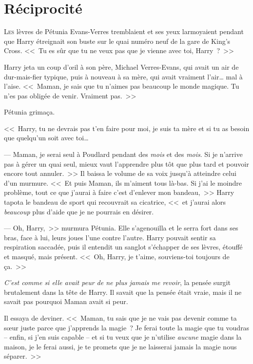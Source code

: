 \chapter{Réciprocité}

\lettrine{L}{es} lèvres de Pétunia Evans-Verres tremblaient et ses yeux larmoyaient pendant que Harry étreignait son buste sur le quai numéro neuf de la gare de King's Cross. <<~Tu es sûr que tu ne veux pas que je vienne avec toi, Harry~?~>>

Harry jeta un coup d'œil à son père, Michael Verres-Evans, qui avait un air de dur-mais-fier typique, puis à nouveau à sa mère, qui avait vraiment l'air… mal à l'aise. <<~Maman, je sais que tu n'aimes pas beaucoup le monde magique. Tu n'es pas obligée de venir. Vraiment pas.~>>

Pétunia grimaça.

<<~Harry, tu ne devrais pas t'en faire pour moi, je suis ta mère et si tu as besoin que quelqu'un soit avec toi…

--- Maman, je serai seul à Poudlard pendant des \emph{mois} et des \emph{mois}. Si je n'arrive pas à gérer un quai seul, mieux vaut l'apprendre plus tôt que plus tard et pouvoir encore tout annuler.~>> Il baissa le volume de sa voix jusqu'à atteindre celui d'un murmure. <<~Et puis Maman, ils m'aiment tous là-bas. Si j'ai le moindre problème, tout ce que j'aurai à faire c'est d'enlever mon bandeau,~>> Harry tapota le bandeau de sport qui recouvrait sa cicatrice, <<~et j'aurai alors \emph{beaucoup} plus d'aide que je ne pourrais en désirer.

--- Oh, Harry,~>> murmura Pétunia. Elle s'agenouilla et le serra fort dans ses bras, face à lui, leurs joues l'une contre l'autre. Harry pouvait sentir sa respiration saccadée, puis il entendit un sanglot s'échapper de ses lèvres, étouffé et masqué, mais présent. <<~Oh, Harry, je t'aime, souviens-toi toujours de ça.~>>

\emph{C'est comme si elle avait peur de ne plus jamais me revoir}, la pensée surgit brutalement dans la tête de Harry. Il savait que la pensée était vraie, mais il ne savait pas pourquoi Maman avait si peur.

Il essaya de deviner. <<~Maman, tu sais que je ne vais pas devenir comme ta sœur juste parce que j'apprends la magie~? Je ferai toute la magie que tu voudras -- enfin, si j'en suis capable -- et si tu veux que je n'utilise \emph{aucune} magie dans la maison, je le ferai aussi, je te promets que je ne laisserai jamais la magie nous séparer.~>>

